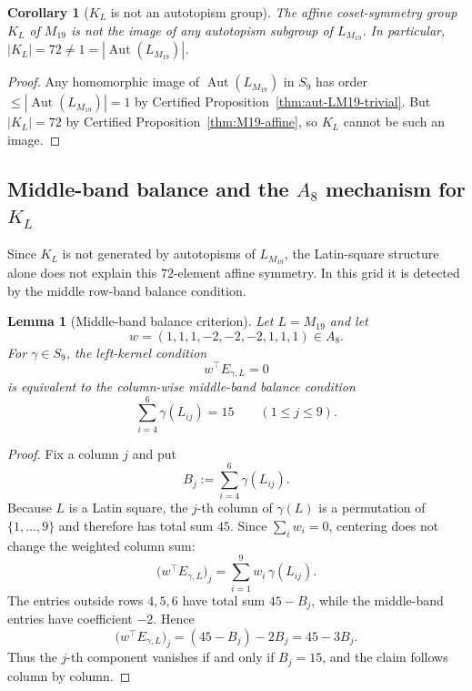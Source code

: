 \documentclass[11pt,a4paper]{article}
\newtheorem{lemma}[theorem]{Lemma}
\newtheorem{corollary}[theorem]{Corollary}
\theoremstyle{definition}
\theoremstyle{remark}
\providecommand{\Aut}{\operatorname{Aut}}
\newcommand{\KL}{K_L}
\begin{document}
\begin{corollary}[$\KL$ is not an autotopism group]
\label{cor:KL-not-autotopism}
The affine coset-symmetry group $\KL$ of $M_{19}$ is not the image of any
autotopism subgroup of $L_{M_{19}}$. In particular, $|\KL| = 72 \neq
1 = |\Aut(L_{M_{19}})|$.
\end{corollary}

\begin{proof}
Any homomorphic image of $\Aut(L_{M_{19}})$ in $S_9$ has order
$\le |\Aut(L_{M_{19}})| = 1$ by Certified Proposition~\ref{thm:aut-LM19-trivial}.
But $|\KL| = 72$ by Certified Proposition~\ref{thm:M19-affine}, so $\KL$ cannot
be such an image.
\end{proof}

\subsection{\texorpdfstring{Middle-band balance and the $A_8$ mechanism for $\KL$}{Middle-band balance and the A8 mechanism for KL}}\label{sec:KL-origin}

Since $\KL$ is not generated by autotopisms of $L_{M_{19}}$, the
Latin-square structure alone does not explain this $72$-element
affine symmetry. In this grid it is detected by the middle row-band
balance condition.

\begin{lemma}[Middle-band balance criterion]
\label{lem:middle-band-balance}
Let $L=M_{19}$ and let
\begin{equation*}
   w=(1,1,1,-2,-2,-2,1,1,1) \in A_8.
\end{equation*}
For $\gamma \in S_9$, the left-kernel condition
\begin{equation*}
   w^{\top} E_{\gamma,L}=0
\end{equation*}
is equivalent to the column-wise middle-band balance condition
\begin{equation}\label{eq:middle-band-balance}
   \sum_{i=4}^{6} \gamma(L_{ij}) = 15
   \qquad (1 \le j \le 9).
\end{equation}
\end{lemma}

\begin{proof}
Fix a column $j$ and put
\begin{equation*}
   B_j := \sum_{i=4}^{6} \gamma(L_{ij}).
\end{equation*}
Because $L$ is a Latin square, the $j$-th column of $\gamma(L)$ is a
permutation of $\{1,\dots,9\}$ and therefore has total sum $45$. Since
$\sum_i w_i=0$, centering does not change the weighted column sum:
\begin{equation*}
   \bigl(w^{\top}E_{\gamma,L}\bigr)_j
   = \sum_{i=1}^{9} w_i\,\gamma(L_{ij}).
\end{equation*}
The entries outside rows $4,5,6$ have total sum $45-B_j$, while the
middle-band entries have coefficient $-2$. Hence
\begin{equation*}
   \bigl(w^{\top}E_{\gamma,L}\bigr)_j
   = (45-B_j)-2B_j
   = 45-3B_j.
\end{equation*}
Thus the $j$-th component vanishes if and only if $B_j=15$, and the
claim follows column by column.
\end{proof}
\end{document}
